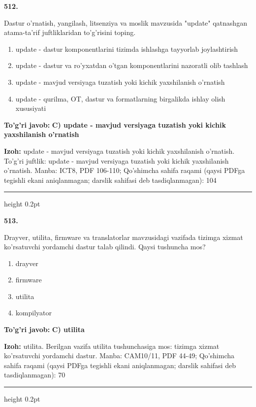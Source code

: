 \documentclass[10pt,a4paper]{article}
\begin{document}
{\bfseries\sffamily\color{ink} 512.}
\par
Dastur o'rnatish, yangilash, litsenziya va moslik mavzusida "update" qatnashgan atama-ta'rif juftliklaridan to'g'risini toping.
\begin{enumerate}[label=\Alph*),leftmargin=9mm]
\item update - dastur komponentlarini tizimda ishlashga tayyorlab joylashtirish
\item update - dastur va ro'yxatdan o'tgan komponentlarini nazoratli olib tashlash
\item update - mavjud versiyaga tuzatish yoki kichik yaxshilanish o'rnatish
\item update - qurilma, OT, dastur va formatlarning birgalikda ishlay olish xususiyati
\end{enumerate}
\begin{tcolorbox}[enhanced,breakable,colback=teal!4,colframe=teal!60!black,boxrule=0.45pt,arc=1.2mm,left=2.7mm,right=2.7mm,top=1.8mm,bottom=1.8mm,before skip=2mm,after skip=2mm]
{\bfseries\sffamily\color{teal}To'g'ri javob:} \textbf{C) update - mavjud versiyaga tuzatish yoki kichik yaxshilanish o'rnatish}
\par\smallskip
{\bfseries Izoh:} update - mavjud versiyaga tuzatish yoki kichik yaxshilanish o'rnatish. To'g'ri juftlik: update - mavjud versiyaga tuzatish yoki kichik yaxshilanish o'rnatish. Manba: ICT8, PDF 106-110; Qo'shimcha sahifa raqami (qaysi PDFga tegishli ekani aniqlanmagan; darslik sahifasi deb tasdiqlanmagan): 104
\end{tcolorbox}
\vspace{2mm}\hrule height 0.2pt\vspace{3mm}

{\bfseries\sffamily\color{ink} 513.}
\par
Drayver, utilita, firmware va translatorlar mavzusidagi vazifada tizimga xizmat ko'rsatuvchi yordamchi dastur talab qilindi. Qaysi tushuncha mos?
\begin{enumerate}[label=\Alph*),leftmargin=9mm]
\item drayver
\item firmware
\item utilita
\item kompilyator
\end{enumerate}
\begin{tcolorbox}[enhanced,breakable,colback=teal!4,colframe=teal!60!black,boxrule=0.45pt,arc=1.2mm,left=2.7mm,right=2.7mm,top=1.8mm,bottom=1.8mm,before skip=2mm,after skip=2mm]
{\bfseries\sffamily\color{teal}To'g'ri javob:} \textbf{C) utilita}
\par\smallskip
{\bfseries Izoh:} utilita. Berilgan vazifa utilita tushunchasiga mos: tizimga xizmat ko'rsatuvchi yordamchi dastur. Manba: CAM10/11, PDF 44-49; Qo'shimcha sahifa raqami (qaysi PDFga tegishli ekani aniqlanmagan; darslik sahifasi deb tasdiqlanmagan): 70
\end{tcolorbox}
\vspace{2mm}\hrule height 0.2pt\vspace{3mm}
\end{document}
